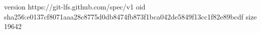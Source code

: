 version https://git-lfs.github.com/spec/v1
oid sha256:e0137cf8071aaa28c8775d0db8474fb873f1bca042de5849f13cc1f82e89bcdf
size 19642
